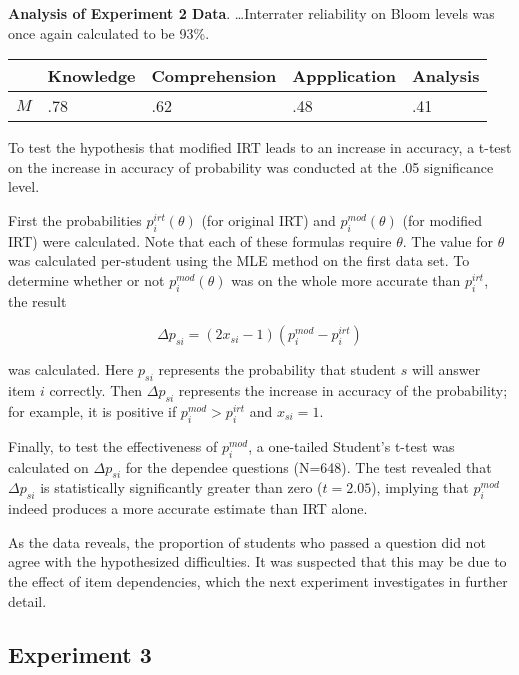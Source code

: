 \textbf{Analysis of Experiment 2 Data}. \ldots Interrater reliability on Bloom
levels was once again calculated to be 93\%. 

\begin{center}
\begin{tabular}{|l|l|l|l|l|}
                                                                 \hline
      &   Knowledge & Comprehension & Appplication & Analysis \\ \hline
 $M$  &  .78 & .62 & .48 & .41  \\ \hline
\end{tabular}
\end{center}


To test the hypothesis that modified IRT leads to an increase in accuracy,
a t-test on the increase in accuracy of probability was conducted at the
.05 significance level.

First the probabilities $p_i^{irt}(\theta)$ (for original IRT) and
$p_i^{mod}(\theta)$ (for modified IRT) were calculated.  Note that each of
these formulas require $\theta$. The value for $\theta$ was calculated
per-student using the MLE method on the first data set.  To determine whether
or not $p_i^{mod}(\theta)$ was on the whole more accurate than $p_i^{irt}$, the
result

\[
  \Delta p_{si} = (2x_{si}-1) (p_i^{mod} - p_i^{irt})
\]

was calculated. Here $p_{si}$ represents the probability that student $s$ will
answer item $i$ correctly.  Then $\Delta p_{si}$ represents the increase in
accuracy of the probability; for example, it is positive if $p_i^{mod} >
p_i^{irt}$ and $x_{si} = 1$.

Finally, to test the effectiveness of $p_i^{mod}$, a one-tailed Student's
t-test was calculated on $\Delta p_{si}$ for the dependee questions (N=648).
The test revealed that $\Delta p_{si}$ is statistically significantly greater
than zero ($t=2.05$), implying that $p_i^{mod}$ indeed produces a more accurate
estimate than IRT alone. 

As the data reveals, the proportion of students who passed a question did not
agree with the hypothesized difficulties.  It was suspected that this may be
due to the effect of item dependencies, which the next experiment investigates
in further detail.

\subsection{Experiment 3}

